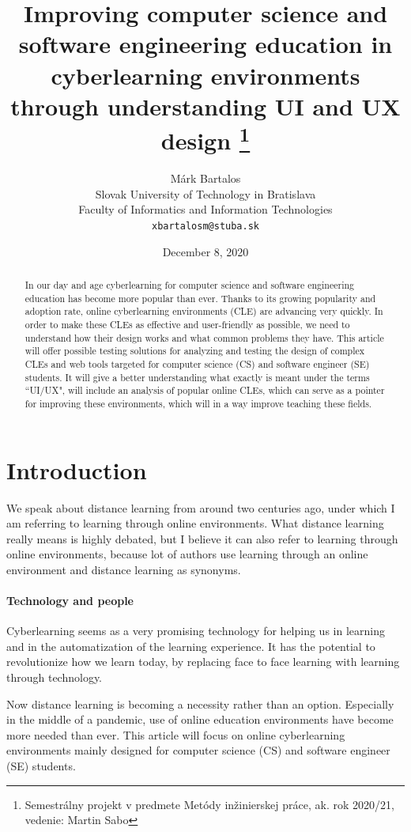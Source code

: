 \documentclass[10pt,english,a4paper]{article}
\title{Improving computer science and software 
engineering education in cyberlearning 
environments through understanding UI and UX design
\thanks{Semestrálny projekt v predmete Metódy inžinierskej práce,
 ak. rok 2020/21, vedenie: Martin Sabo}}
\author{Márk Bartalos \\[2pt]
        \small{Slovak University of Technology in Bratislava}\\
        \small{Faculty of Informatics and Information Technologies}\\
        \small{\texttt{xbartalosm@stuba.sk}}
}
\date{December 8, 2020}
\begin{document}
\maketitle

\begin{abstract}
    In our day and age cyberlearning for computer science and software engineering education has become more popular than ever.
    Thanks to its growing popularity and adoption rate, online cyberlearning environments (CLE) are advancing very quickly.
    In order to make these CLEs as effective and user-friendly as possible, we need to understand how their design
    works and what common problems they have. This article will offer possible testing solutions for analyzing and testing
    the design of complex CLEs and web tools targeted for computer science (CS) and software engineer (SE) students. 
    It will give a better understanding what exactly is meant under the terms ``UI/UX", will include an analysis of
    popular online CLEs, which can serve as a pointer for improving these environments, which will in a way improve teaching these fields.
\end{abstract}



\section{Introduction}
We speak about distance learning from around two centuries ago, under which
I am referring to learning through online environments\cite{moore_2011_elearning}. What distance learning really means is highly debated,
but I believe it can also refer to learning through online environments, because lot of authors use learning through an online environment and distance learning as
synonyms\cite{moore_2011_elearning}\cite{distance_definition}. 
\paragraph{Technology and people}
Cyberlearning seems as a very promising technology for helping us in learning and in the automatization of the learning
experience. It has the potential to revolutionize how we learn today, by replacing face to face learning with
learning through technology.

Now distance learning is becoming a necessity rather than an option. Especially in the middle of a pandemic, use of online 
education environments have become more needed than ever. This article will focus on online cyberlearning environments 
mainly designed for computer science (CS) and software engineer (SE) students.
\end{document}
